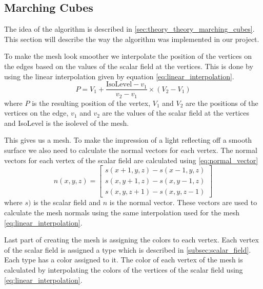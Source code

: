 \subsection{Marching Cubes} \label{subsec:marching_cubes}
The idea of the algorithm is described in \autoref*{sec:theory_theory_marching_cubes}.
This section will describe the way the algorithm was implemented in our project.

To make the mesh look smoother we interpolate the position of the vertices on the edges based on the values of the scalar field at the vertices.
This is done by using the linear interpolation given by equation \autoref{eq:linear_interpolation}.
\begin{equation}
  \label{eq:linear_interpolation}
  P = V_1 + \frac{\text{IsoLevel} - v_1}{v_2 - v_1} \times (V_2 - V_1)
\end{equation}
where $P$ is the resulting position of the vertex, $V_1$ and $V_2$ are the positions of the vertices on the edge, $v_1$ and $v_2$ are the values of the scalar field at the vertices and IsoLevel is the isolevel of the mesh.
  
This gives us a mesh.
To make the impression of a light reflecting off a smooth surface we also need to calculate the normal vectors for each vertex.
The normal vectors for each vertex of the scalar field are calculated using \autoref*{eq:normal_vector}
\begin{equation}
    \label{eq:normal_vector}
    n(x, y, z) = \begin{bmatrix}
        s(x + 1, y, z) - s(x - 1, y, z) \\
        s(x, y + 1, z) - s(x, y - 1, z) \\
        s(x, y, z + 1) - s(x, y, z - 1)
      \end{bmatrix}
\end{equation}
where $s)$ is the scalar field and $n$ is the normal vector.
These vectors are used to calculate the mesh normals using the same interpolation used for the mesh \autoref{eq:linear_interpolation}.

Last part of creating the mesh is assigning the colors to each vertex.
Each vertex of the scalar field is assigned a type which is described in \autoref*{subsec:scalar_field}.
Each type has a color assigned to it.
The color of each vertex of the mesh is calculated by interpolating the colors of the vertices of the scalar field using \autoref{eq:linear_interpolation}.

